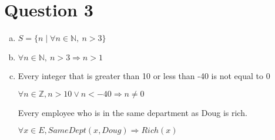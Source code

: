 \documentclass[12pt]{article}
\begin{document}
\section*{Question 3}
\begin{enumerate}[a.]
    \item

    $S = \{n \mid \forall n \in \mathbb{N},\:n > 3\}$

    \item

    $\forall n \in \mathbb{N},\:n > 3 \Rightarrow n > 1$

    \item

    Every integer that is greater than 10 or less than -40 is not equal to 0

    $\forall n \in \mathbb{Z}, n > 10 \lor n < -40 \Rightarrow n \neq 0$

    \bigskip

    Every employee who is in the same department as Doug is rich.

    $\forall x \in E, SameDept(x, Doug) \Rightarrow Rich(x)$

\end{enumerate}
\end{document}
